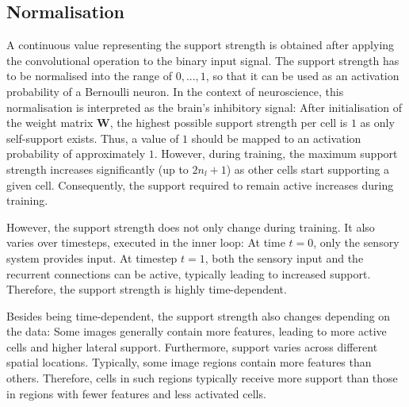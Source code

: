 \subsection{Normalisation}
A continuous value representing the support strength is obtained after applying the convolutional operation to the binary input signal.
The support strength has to be normalised into the range of $0, ..., 1$, so that it can be used as an activation probability of a Bernoulli neuron.
In the context of neuroscience, this normalisation is interpreted as the brain's inhibitory signal:
After initialisation of the weight matrix $\boldsymbol{W}$, the highest possible support strength per cell is $1$ as only self-support exists. Thus, a value of $1$ should be mapped to an activation probability of approximately $1$. However, during training, the maximum support strength increases significantly (up to $2n_l + 1$) as other cells start supporting a given cell.
Consequently, the support required to remain active increases during training.

However, the support strength does not only change during training. It also varies over timesteps, executed in the inner loop: At time $t=0$, only the sensory system provides input. At timestep $t=1$, both the sensory input and the recurrent connections can be active, typically leading to increased support. Therefore, the support strength is highly time-dependent.

Besides being time-dependent, the support strength also changes depending on the data:
Some images generally contain more features, leading to more active cells and higher lateral support. Furthermore, support varies across different spatial locations. Typically, some image regions contain more features than others. Therefore, cells in such regions typically receive more support than those in regions with fewer features and less activated cells.

